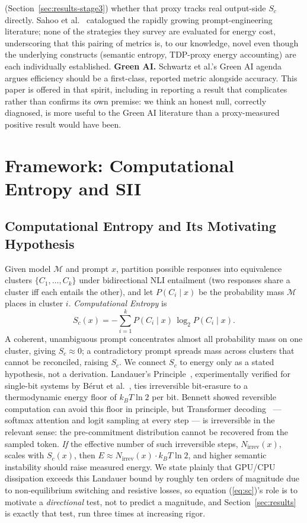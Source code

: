 \documentclass[conference]{IEEEtran}
\begin{document}
(Section~\ref{sec:results-stage3}) whether that proxy tracks real
output-side $S_c$ directly. Sahoo et al.~\cite{sahoo2024systematic}
catalogued the rapidly growing prompt-engineering literature; none of
the strategies they survey are evaluated for energy cost, underscoring
that this pairing of metrics is, to our knowledge, novel even though
the underlying constructs (semantic entropy, TDP-proxy energy
accounting) are each individually established.
\textbf{Green AI.} Schwartz et al.'s Green AI
agenda~\cite{schwartz2020green} argues efficiency should be a
first-class, reported metric alongside accuracy. This paper is offered
in that spirit, including in reporting a result that complicates
rather than confirms its own premise: we think an honest null,
correctly diagnosed, is more useful to the Green AI literature than a
proxy-measured positive result would have been.
\section{Framework: Computational Entropy and SII}
\label{sec:framework}
\subsection{Computational Entropy and Its Motivating Hypothesis}
Given model $\mathcal{M}$ and prompt $x$, partition possible responses
into equivalence clusters $\{C_1,\ldots,C_k\}$ under bidirectional NLI
entailment (two responses share a cluster iff each entails the other),
and let $P(C_i\mid x)$ be the probability mass $\mathcal{M}$ places in
cluster $i$. \emph{Computational Entropy} is
\begin{equation}
  S_c(x) = -\sum_{i=1}^{k} P(C_i \mid x)\,\log_2 P(C_i \mid x).
  \label{eq:sc}
\end{equation}
A coherent, unambiguous prompt concentrates almost all probability
mass on one cluster, giving $S_c\approx0$; a contradictory prompt
spreads mass across clusters that cannot be reconciled, raising $S_c$.
We connect $S_c$ to energy only as a stated hypothesis, not a
derivation. Landauer's Principle~\cite{landauer1961irrev},
experimentally verified for single-bit systems by B\'erut et
al.~\cite{berut2012experimental}, ties irreversible bit-erasure to a
thermodynamic energy floor of $k_BT\ln2$ per bit. Bennett
\cite{bennett1982thermo} showed reversible computation can avoid this
floor in principle, but Transformer decoding~\cite{vaswani2017attention}
--- softmax attention and logit sampling at every step --- is
irreversible in the relevant sense: the pre-commitment distribution
cannot be recovered from the sampled token. \emph{If} the effective
number of such irreversible steps, $N_\text{irrev}(x)$, scales with
$S_c(x)$, then $E\approx N_\text{irrev}(x)\cdot k_BT\ln2$, and higher
semantic instability should raise measured energy. We state plainly
that GPU/CPU dissipation exceeds this Landauer bound by roughly ten
orders of magnitude due to non-equilibrium switching and resistive
losses, so equation (\ref{eq:sc})'s role is to motivate a
\emph{directional} test, not to predict a magnitude, and
Section~\ref{sec:results} is exactly that test, run three times at
increasing rigor.
\end{document}
